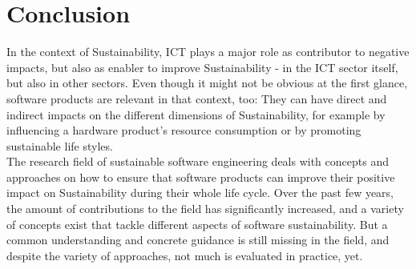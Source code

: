\documentclass[oribibl]{llncs}
\begin{document}
\section{Conclusion}
In the context of Sustainability, ICT plays a major role as contributor to negative impacts, but also as enabler to improve Sustainability - in the ICT sector itself, but also in other sectors. Even though it might not be obvious at the first glance, software products are relevant in that context, too: They can have direct and indirect impacts on the different dimensions of Sustainability, for example by influencing a hardware product's resource consumption or by promoting sustainable life styles.\\
The research field of sustainable software engineering deals with concepts and approaches on how to ensure that software products can improve their positive impact on Sustainability during their whole life cycle. Over the past few years, the amount of contributions to the field has significantly increased, and a variety of concepts exist that tackle different aspects of software sustainability. But a common understanding and concrete guidance is still missing in the field, and despite the variety of approaches, not much is evaluated in practice, yet.
\end{document}

